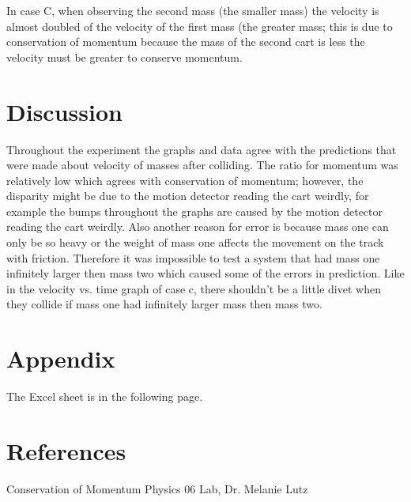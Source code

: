 \documentclass[aps,letterpaper,11pt]{revtex4}
\begin{document}
In case C, when observing the second mass (the smaller mass) the velocity is almost doubled of the velocity of the first mass (the greater mass; this is due to conservation of momentum because the mass of the second cart is less the velocity must be greater to conserve momentum. 

\section{Discussion} 

Throughout the experiment the graphs and data agree with the predictions that were made about velocity of masses after colliding. The ratio for momentum was relatively low which agrees with conservation of momentum; however, the disparity might be due to the motion detector reading the cart weirdly, for example the bumps throughout the graphs are caused by the motion detector reading the cart weirdly. Also another reason for error is because mass one can only be so heavy or the weight of mass one affects the movement on the track with friction. Therefore it was impossible to test a system that had mass one infinitely larger then mass two which caused some of the errors in prediction. Like in the velocity vs. time graph of case c, there shouldn't be a little divet when they collide if mass one had infinitely larger mass then mass two.

\section{Appendix}

The Excel sheet is in the following page.


\section{References}

\hspace{-6.5mm}
Conservation of Momentum Physics 06 Lab, Dr. Melanie Lutz\\
\end{document}

